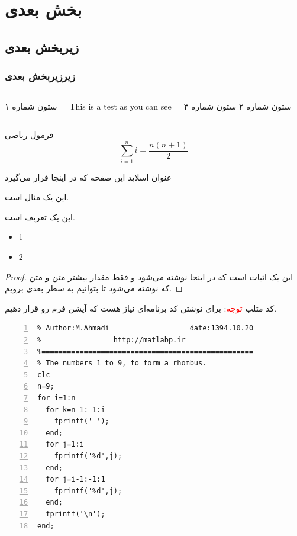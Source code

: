 \documentclass[10pt,xcolor=dvipsnames]{beamer}
\begin{document}
\section{بخش بعدی}
\subsection{زیربخش بعدی}
\subsubsection{زیرزیربخش بعدی}
\begin{frame}
\begin{columns} 
ستون شماره ۱
\begin{latin}
This is a test as you can see
\end{latin}
ستون شماره ۲
ستون شماره ۳
\end{columns}

\begin{block}{فرمول ریاضی}
\begin{equation}
\sum_{i=1}^{n} i = \frac{n(n+1)}{2}
\end{equation}
\end{block}

\end{frame}
\begin{frame}{عنوان اسلاید این صفحه  که در اینجا قرار می‌گیرد}
\begin{example}
این یک مثال است.
\end{example}


\begin{definition}
این یک تعریف است.
\begin{itemize}\raggedright
\item 1
\item 2
\end{itemize}
\end{definition}

\begin{proof}
این یک اثبات است که در اینجا نوشته می‌شود و فقط مقدار بیشتر متن و متن که نوشته می‌شود تا بتوانیم به سطر بعدی برویم.
\end{proof}

\end{frame}
\begin{frame}[fragile]{کد متلب}
\textcolor{red}{توجه}:
برای نوشتن کد برنامه‌ای نیاز هست که آپشن فرم رو 
قرار دهیم.
\begin{latin}
\begin{lstlisting}[frame=single,rulecolor=\color{magenta},numbers=left,numberstyle=\tiny]
%==================================================
% Author:M.Ahmadi                   date:1394.10.20
%                 http://matlabp.ir
%==================================================
% The numbers 1 to 9, to form a rhombus.
clc
n=9;
for i=1:n
  for k=n-1:-1:i
    fprintf(' ');
  end;
  for j=1:i
    fprintf('%d',j);
  end;
  for j=i-1:-1:1
    fprintf('%d',j);
  end;
  fprintf('\n');
end;
\end{lstlisting}
\end{latin}
\end{frame}
\end{document}

